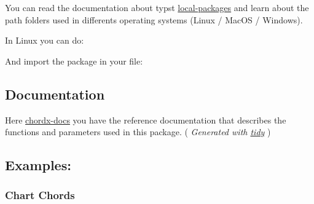 You can read the documentation about typst
\href{https://github.com/typst/packages\#local-packages}{local-packages}
and learn about the path folders used in differents operating systems
(Linux / MacOS / Windows).

In Linux you can do:

\begin{Shaded}
\begin{Highlighting}[]
\end{Highlighting}
\end{Shaded}

And import the package in your file:

\begin{Shaded}
\begin{Highlighting}[]
\end{Highlighting}
\end{Shaded}

\subsection{Documentation}\label{documentation}

Here
\href{https://github.com/ljgago/typst-chords/blob/v0.5.0/docs/chordx-docs.pdf}{chordx-docs}
you have the reference documentation that describes the functions and
parameters used in this package. ( \emph{Generated with
\href{https://github.com/Mc-Zen/tidy}{tidy}} )

\subsection{Examples:}\label{examples}

\subsubsection{Chart Chords}\label{chart-chords}


